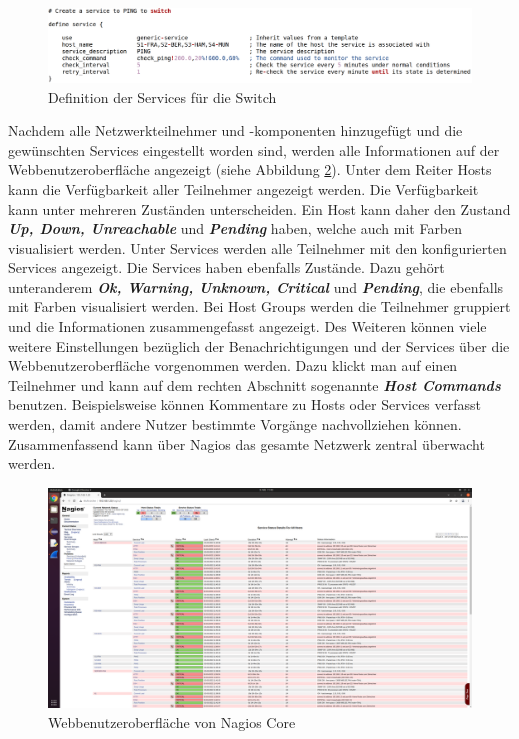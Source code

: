 \documentclass[fontsize=12pt,paper=a4,open=any,parskip=half,
  twoside=false,toc=listof,toc=bibliography,fleqn,leqno,
  captions=nooneline,captions=tableabove,british]{scrbook}
\begin{document}
\begin{figure}[H]
 \centering
 \includegraphics[width=1.0\textwidth]{Bilder/nagios-service}
 \captionsetup{justification=centering, margin=2cm}
 \caption{Definition der Services für die Switch}
 \label{nagios-service}
\end{figure}
Nachdem alle Netzwerkteilnehmer und -komponenten hinzugefügt und die gewünschten Services eingestellt worden sind, werden alle Informationen auf der Webbenutzeroberfläche angezeigt (siehe Abbildung \ref{nagios}). Unter dem Reiter Hosts kann die Verfügbarkeit aller Teilnehmer angezeigt werden. Die Verfügbarkeit kann unter mehreren Zuständen unterscheiden. Ein Host kann daher den Zustand \textit{\textbf{Up, Down, Unreachable}} und \textit{\textbf{Pending}} haben, welche auch mit Farben visualisiert werden. Unter Services werden alle Teilnehmer mit den konfigurierten Services angezeigt. Die Services haben ebenfalls Zustände. Dazu gehört unteranderem \textit{\textbf{Ok, Warning, Unknown, Critical}} und \textit{\textbf{Pending}}, die ebenfalls mit Farben visualisiert werden. Bei Host Groups werden die Teilnehmer gruppiert und die Informationen zusammengefasst angezeigt. Des Weiteren können viele weitere Einstellungen bezüglich der Benachrichtigungen und der Services über die Webbenutzeroberfläche vorgenommen werden. Dazu klickt man auf einen Teilnehmer und kann auf dem rechten Abschnitt sogenannte \textit{\textbf{Host Commands}} benutzen. Beispielsweise können Kommentare zu Hosts oder Services verfasst werden, damit andere Nutzer bestimmte Vorgänge nachvollziehen können. Zusammenfassend kann über Nagios das gesamte Netzwerk zentral überwacht werden.


\begin{figure}[H]
 \centering
 \includegraphics[width=1.0\textwidth]{Bilder/nagios}
 \captionsetup{justification=centering, margin=2cm}
 \caption{Webbenutzeroberfläche von Nagios Core}
 \label{nagios}
\end{figure}
\end{document}
